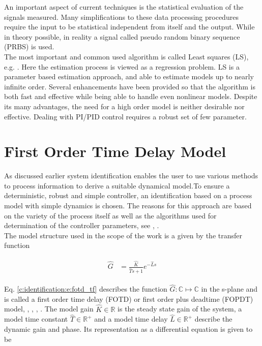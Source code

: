 An important aspect of current techniques is the statistical evaluation of the signals measured. Many simplifications to these data processing procedures require the input to be statistical independent from itself and the output. While in theory possible, in reality a signal called pseudo random binary sequence (PRBS) is used.\\

The most important and common used algorithm is called Least squares (LS), e.g. \cite[p.62 ff.]{Keesman2011}. Here the estimation process is viewed as a regression problem. LS is a parameter based estimation approach, and able to estimate models up to nearly infinite order. Several enhancements have been provided so that the algorithm is both fast and effective while being able to handle even nonlinear models. Despite its many advantages, the need for a high order model is neither desirable nor effective. Dealing with PI/PID control requires a robust set of few parameter.\\

\section{First Order Time Delay Model}%
\label{c:identification:s:fotd}

As discussed earlier system identification enables the user to use various methods to process information to derive a suitable dynamical model.To ensure a deterministic, robust and simple controller, an identification based on a process model with simple dynamics is chosen. The reasons for this approach are based on the variety of the process itself as well as the algorithms used for determination of the controller parameters, see \cite{Astrom1995}, \cite{Astrom2006}.\\

The model structure used in the scope of the work is a given by the transfer function

\begin{align}
\begin{split}
\hat{G} &= \frac{\hat{K}}{\hat{T}s+1}e^{-\hat{L}s}
\end{split}
\label{c:identification:e:fotd_tf}
\end{align}

Eq. \ref{c:identification:e:fotd_tf} describes the function $\hat{G}: \mathbb{C} \mapsto \mathbb{C}$ in the s-plane and is called a first order time delay (FOTD) or first order plus deadtime (FOPDT) model, \cite[p.16]{Astrom1995}, \cite[p.20, p.26]{Astrom2006}, \cite{Fedele2009a}, \cite{Bi1999}.
The model gain $\hat{K} \in \mathbb{R}$ is the steady state gain of the system, a model time constant $\hat{T} \in \mathbb{R}^+$ and a model time delay $\hat{L} \in \mathbb{R}^+$ describe the dynamic gain and phase. Its representation as a differential equation is given to be

